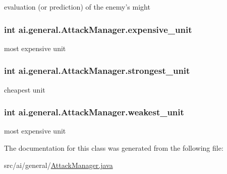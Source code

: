 \label{classai_1_1general_1_1_attack_manager_aab9e1ce511b6c0764d792ab3c2103785}
evaluation (or prediction) of the enemy's might \hypertarget{classai_1_1general_1_1_attack_manager_abea8941d89fe13d1881fe0678dea992f}{
\subsubsection[{expensive\_\-unit}]{\setlength{\rightskip}{0pt plus 5cm}int {\bf ai.general.AttackManager.expensive\_\-unit}}}
\label{classai_1_1general_1_1_attack_manager_abea8941d89fe13d1881fe0678dea992f}
most expensive unit \hypertarget{classai_1_1general_1_1_attack_manager_a912061f6610cd3044c1b4988d82df9f9}{
\subsubsection[{strongest\_\-unit}]{\setlength{\rightskip}{0pt plus 5cm}int {\bf ai.general.AttackManager.strongest\_\-unit}}}
\label{classai_1_1general_1_1_attack_manager_a912061f6610cd3044c1b4988d82df9f9}
cheapest unit \hypertarget{classai_1_1general_1_1_attack_manager_aa3699a50514e74fe1d952ab992ca3e17}{
\subsubsection[{weakest\_\-unit}]{\setlength{\rightskip}{0pt plus 5cm}int {\bf ai.general.AttackManager.weakest\_\-unit}}}
\label{classai_1_1general_1_1_attack_manager_aa3699a50514e74fe1d952ab992ca3e17}
most expensive unit 

The documentation for this class was generated from the following file:\begin{DoxyCompactItemize}
\item 
src/ai/general/\hyperlink{_attack_manager_8java}{AttackManager.java}\end{DoxyCompactItemize}
